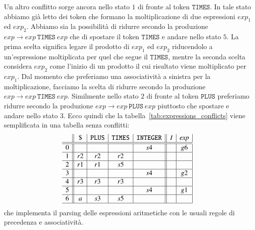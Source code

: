Un altro conflitto sorge ancora nello stato $1$ di fronte al token
$\mathtt{TIMES}$. In tale stato abbiamo gi\`a letto dei token che formano
la moltiplicazione di due espressioni $\mathit{exp}_1$ ed $\mathit{exp}_2$.
Abbiamo sia la possibilit\`a di ridurre secondo la produzione
$\mathit{exp}\to\mathit{exp}\ \mathtt{TIMES}\ \mathit{exp}$ che
di spostare il token $\mathtt{TIMES}$
e andare nello stato $5$. La prima scelta significa
legare il prodotto di $\mathit{exp}_1$ ed $\mathit{exp}_2$
riducendolo a un'espressione moltiplicata per
quel che segue il $\mathtt{TIMES}$, mentre la seconda scelta considera
$\mathit{exp}_2$ come l'inizio di un prodotto il cui risultato
viene moltiplicato per $\mathit{exp}_1$. Dal momento che preferiamo una
associativit\`a a sinistra per la moltiplicazione, facciamo la scelta di
ridurre secondo la produzione
$\mathit{exp}\to\mathit{exp}\ \mathtt{TIMES}\ \mathit{exp}$.
Similmente nello stato $2$ di fronte al token $\mathtt{PLUS}$ preferiamo
ridurre secondo la produzione
$\mathit{exp}\to\mathit{exp}\ \mathtt{PLUS}\ \mathit{exp}$ piuttosto
che spostare e andare nello stato $3$. Ecco quindi che la
tabella~\eqref{tab:expressions_conflicts}
viene semplificata in una tabella senza conflitti:
%
\[
\begin{array}{c||c|c|c|c||c|c|}
  & \mathtt{\$} & \mathtt{PLUS} & \mathtt{TIMES} & \mathtt{INTEGER} & I  & \mathit{exp}\\\hline\hline
0 &             &     &     & s4   &    & g6 \\\hline
1 & r2          & r2 & r2 &      &    &    \\\hline
2 & r1          & r1 & s5 &      &    &    \\\hline
3 &             &     &     & s4   &    & g2 \\\hline
4 & r3          & r3  & r3  &      &    &    \\\hline
5 &             &     &     & s4   &    & g1 \\\hline
6 & a           & s3  & s5  &      &    &    \\\hline
\end{array}
\]
che implementa il parsing delle espressioni aritmetiche con le
usuali regole di precedenza e associativit\`a.

